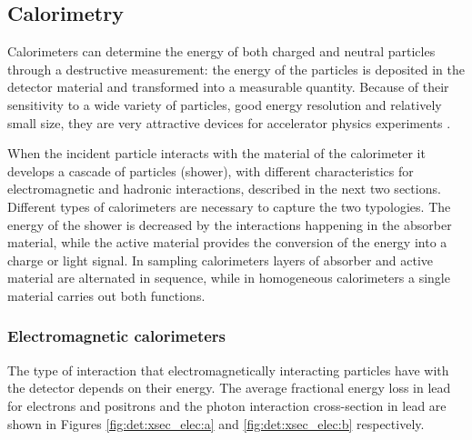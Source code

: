 \subsection{Calorimetry}
\label{sec:dec:calo}

Calorimeters can determine the energy of both charged and neutral particles through a destructive measurement: the energy of the particles is deposited in the detector material and transformed into a measurable quantity. Because of their sensitivity to a wide variety of particles, good energy resolution and relatively small size, they are very attractive devices for accelerator physics experiments \cite{RevModPhys.75.1243,Wigmans:2000vf}.

When the incident particle interacts with the material of the calorimeter it develops a cascade of particles (shower), with different characteristics for electromagnetic and hadronic interactions, described in the next two sections. Different types of calorimeters are necessary to capture the two typologies. The energy of the shower is decreased by the interactions happening in the absorber material, while the active material provides the conversion of the energy into a charge or light signal. In sampling calorimeters layers of absorber and active material are alternated in sequence, while in homogeneous calorimeters a single material carries out both functions.


\subsubsection*{Electromagnetic calorimeters}

The type of interaction that electromagnetically interacting particles have with the detector depends on their energy. The average fractional energy loss in lead for electrons and positrons and the photon interaction cross-section in lead are shown in Figures \ref{fig:det:xsec_elec:a} and \ref{fig:det:xsec_elec:b} respectively. 

